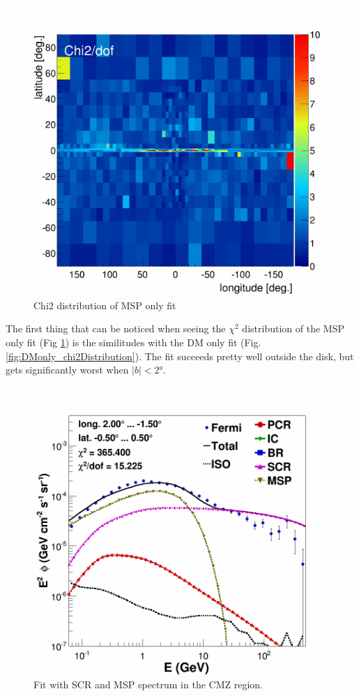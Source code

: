\begin{figure}
  \centering
  \includegraphics[width=.9\linewidth]{pic/results/MSPonly_chi2Distribution.png}
  \caption{Chi2 distribution of MSP only fit}
  \label{fig:MSPonly_chi2Distribution}
\end{figure}

The first thing that can be noticed when seeing the $\chi^2$ distribution of the MSP only fit (Fig \ref{fig:MSPonly_chi2Distribution}) is the similitudes with the DM only fit (Fig. \ref{fig:DMonly_chi2Distribution}). The fit succeeds pretty well outside the disk, but gets significantly worst when $|b| < 2°$.

\begin{figure}
  \centering
  \includegraphics[width=.9\linewidth]{pic/results/MSPonly_CMZ.png}
  \caption{Fit with SCR and MSP spectrum in the CMZ region.}
  \label{fig:MSP_only_CMZ}
\end{figure}


